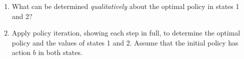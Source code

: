 \documentclass[11pt, a4paper]{article}
\begin{document}
\begin{enumerate}
    \item What can be determined \emph{qualitatively} about the optimal policy in states 1 and 2?

    \item Apply policy iteration, showing each step in full, to determine the optimal policy and the values of states 1 and 2. Assume that the initial policy has action $b$ in both states.

\end{enumerate}
\end{document}
